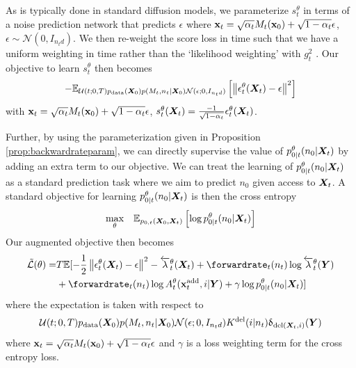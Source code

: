 As is typically done in standard diffusion models, we parameterize $s_t^\theta$ in terms of a noise prediction network that predicts $\epsilon$ where ${\mathbf{x}}_t = \sqrt{\alpha_t}M_t({\mathbf{x}}_0) + \sqrt{1- \alpha_t} \epsilon$, $\epsilon \sim \mathcal{N}(0, I_{n_t d})$. We then re-weight the score loss in time such that we have a uniform weighting in time rather than the `likelihood weighting' with $g_t^2$ \cite{song2020score, song2021maximum}. Our objective to learn $s_t^\theta$ then becomes
\begin{equation}
    - \mathbb{E}_{\mathcal{U}(t; 0, T) p_{\rm{data}}({\bm{X}}_0) p(M_t, n_t | {\bm{X}}_0) \mathcal{N}(\epsilon; 0, I_{n_t d})} \left[ \left\lVert\epsilon_t^\theta({\bm{X}}_t) - \epsilon\right\rVert^2 \right]
\end{equation}
with ${\mathbf{x}}_t = \sqrt{\alpha_t} M_t({\mathbf{x}}_0) + \sqrt{1 - \alpha_t} \epsilon$, $s_t^\theta({\bm{X}}_t) = \frac{-1}{\sqrt{1-\alpha_t}} \epsilon_t^\theta({\bm{X}}_t)$.

Further, by using the parameterization given in Proposition \ref{prop:backwardrateparam}, we can directly supervise the value of $p_{0|t}^\theta(n_0 | {\bm{X}}_t)$ by adding an extra term to our objective. We can treat the learning of $p_{0|t}^\theta(n_0 | {\bm{X}}_t)$ as a standard prediction task where we aim to predict $n_0$ given access to ${\bm{X}}_t$. A standard objective for learning $p_{0|t}^\theta(n_0 | {\bm{X}}_t)$ is then the cross entropy
\begin{equation}
    \underset{\theta}{\text{max}} \quad \mathbb{E}_{p_{0,t}({\bm{X}}_0, {\bm{X}}_t)} \left[ \log p_{0|t}^{\theta}(n_0 | {\bm{X}}_t) \right] 
\end{equation}
Our augmented objective then becomes
\begin{align}
    \tilde{\mathcal{L}}(\theta) = &T\mathbb{E} [ -\frac{1}{2}\norm{\epsilon_t^\theta(\mX_t) - \epsilon}^2 - \backwardrate_t^\theta(\mX_t) + \forwardrate_t(n_t) \log \backwardrate_t^\theta(\mY) \\ 
    &+ \forwardrate_t(n_t) \log \autonet_t^\theta(\xadd_t, i | \mY) + \gamma \log p_{0|t}^\theta (n_0 | \mX_t) ] \nonumber
    \label{eq:augmentedObjective}
\end{align}
where the expectation is taken with respect to 
\begin{equation}
\mathcal{U}(t; 0, T) p_{\rm{data}}({\bm{X}}_0) p(M_t, n_t | {\bm{X}}_0) \mathcal{N}(\epsilon; 0, I_{n_t d}) K^{\textup{del}}(i | n_t) \updelta_{\text{del}({\bm{X}}_t, i)}({\bm{Y}})
\end{equation}
where ${\mathbf{x}}_t = \sqrt{\alpha_t} M_t({\mathbf{x}}_0) + \sqrt{1 - \alpha_t} \epsilon$ and $\gamma$ is a loss weighting term for the cross entropy loss.


